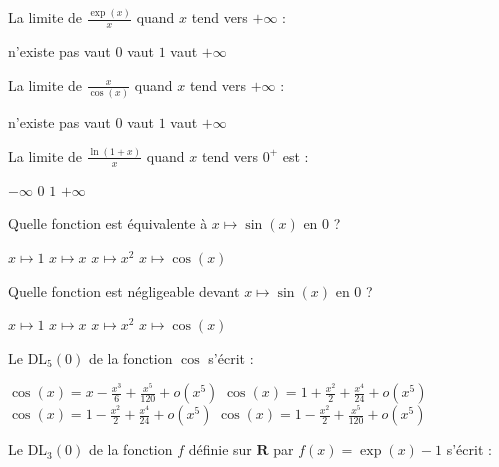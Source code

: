 \documentclass{exam}[5pts]
\begin{document}
\begin{questions}

\question La limite de $\frac{\exp(x)}{x}$ quand $x$ tend vers $+\infty$ :

\begin{oneparchoices}
 \choice n'existe pas
 \choice vaut $0$
 \choice vaut $1$
 \choice vaut $+\infty$
\end{oneparchoices}

\question La limite de $\frac{x}{\cos(x)}$ quand $x$ tend vers $+\infty$ :

\begin{oneparchoices}
 \choice n'existe pas
 \choice vaut $0$
 \choice vaut $1$
 \choice vaut $+\infty$
\end{oneparchoices}

\question La limite de $\frac{\ln (1+x)}{x}$ quand $x$ tend vers $0^+$ est :

\begin{oneparchoices}
 \choice $-\infty$ 
 \choice $0$
 \choice $1$
 \choice $+\infty$
\end{oneparchoices}

\question Quelle fonction est équivalente à $x \mapsto \sin(x)$ en 0 ?

\begin{oneparchoices}
 \choice $x \mapsto 1$
 \choice $x \mapsto x$ 
 \choice $x \mapsto x^2$
 \choice $x \mapsto \cos(x)$
  
\end{oneparchoices}
    
\question Quelle fonction est négligeable devant $x \mapsto \sin(x)$ en 0 ?

\begin{oneparchoices}
 \choice $x \mapsto 1$
 \choice $x \mapsto x$ 
 \choice $x \mapsto x^2$
 \choice $x \mapsto \cos(x)$
\end{oneparchoices}

\question Le DL$_5(0)$ de la fonction $\cos$ s'écrit :

\begin{choices}
 \choice $\cos(x) =  x -\frac{x^3}{6} + \frac{x^5}{120} + o(x^5)$ 
 \choice $\cos(x) =  1 + \frac{x^2}{2} + \frac{x^4}{24} + o(x^5)$
 \choice $\cos(x) =  1 - \frac{x^2}{2} + \frac{x^4}{24} + o(x^5)$
 \choice $\cos(x) =  1 - \frac{x^2}{2} + \frac{x^5}{120} + o(x^5)$
\end{choices}

\question Le DL$_3(0)$ de la fonction $f$ définie sur $\mathbf{R}$ par $f(x) = \exp(x)-1$ s'écrit :


\end{questions}
\end{document}
